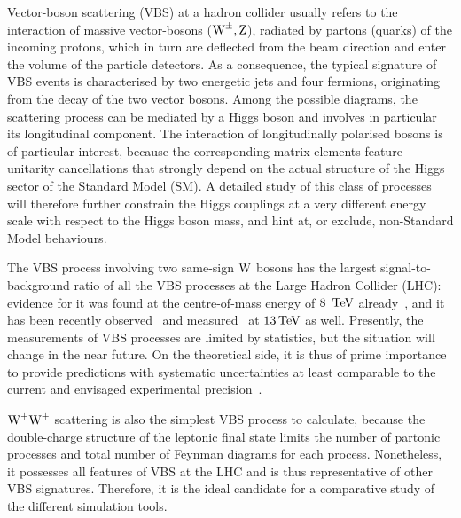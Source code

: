 Vector-boson scattering (VBS) at a hadron collider 
usually refers to the interaction of massive vector-bosons ($\text{W}^\pm,\text{Z}$),
radiated by partons (quarks) of the incoming protons, 
which in turn are deflected from the beam direction 
and enter the volume of the particle detectors.
As a consequence, the typical signature of VBS events
is characterised by two energetic jets 
and four fermions,
originating from the decay of the two vector bosons.
Among the possible diagrams,
the scattering process can be mediated by a Higgs boson
and involves in particular its longitudinal component.
The interaction of longitudinally polarised bosons is of particular interest, 
because the corresponding matrix elements feature unitarity cancellations 
that strongly depend on the actual structure of the Higgs sector of the Standard Model (SM).
A detailed study of this class of processes will therefore further constrain the Higgs couplings 
at a very different energy scale with respect to the Higgs boson mass,
and hint at, or exclude, non-Standard Model behaviours.

The VBS process involving two same-sign $\text{W}$ bosons has the largest signal-to-background ratio of all the VBS processes at the Large Hadron Collider (LHC):
evidence for it was found at the centre-of-mass energy of $8~\,\text{TeV}$ already~\cite{Aad:2014zda,Khachatryan:2014sta},
and it has been recently observed~\cite{Sirunyan:2017ret} and measured~\cite{Aaboud:2016ffv} 
at $13\,\text{TeV}$ as well.
Presently, the measurements of VBS processes are limited by statistics, but the situation will change in the near future.
On the theoretical side, 
it is thus of prime importance to provide predictions with systematic uncertainties
at least comparable to the current and envisaged experimental precision~\cite{CMS:2016rcn}.


$\text{W}^+\text{W}^+$ scattering is also the simplest VBS process to calculate, 
because the double-charge structure of the leptonic final state 
limits the number of partonic processes and total number of Feynman diagrams for each process.
Nonetheless, it possesses all features of VBS at the LHC and is thus representative of other VBS signatures.
Therefore, it is the ideal candidate for a comparative study of the different simulation tools.

